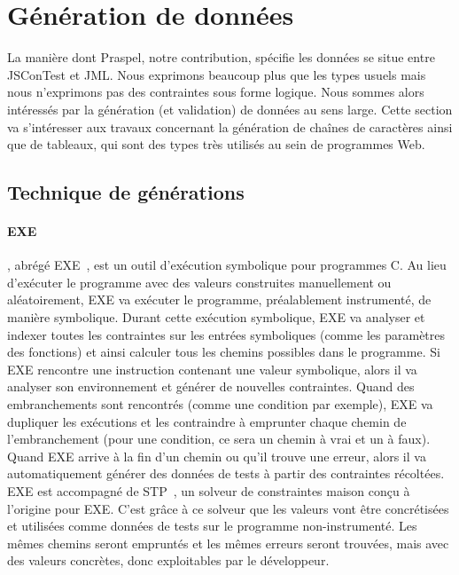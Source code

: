 \section{Génération de données}
\label{section:sota:data_generation}

La manière dont Praspel, notre contribution, spécifie les données se situe entre
JSConTest et JML. Nous exprimons beaucoup plus que les types usuels mais nous
n'exprimons pas des contraintes sous forme logique. Nous sommes alors
intéressés par la génération (et validation) de données au sens large. Cette
section va s'intéresser aux travaux concernant la génération de chaînes de
caractères ainsi que de tableaux, qui sont des types très utilisés au sein de
programmes Web.

\subsection{Technique de générations}

\paragraph{EXE} , abrégé
EXE~, est un outil d'exécution symbolique pour
programmes C. Au lieu d'exécuter le programme avec des valeurs construites
manuellement ou aléatoirement, EXE va exécuter le programme, préalablement
instrumenté, de manière symbolique. Durant cette exécution symbolique, EXE va
analyser et indexer toutes les contraintes sur les entrées symboliques (comme
les paramètres des fonctions) et ainsi calculer tous les chemins possibles dans
le programme.  Si EXE rencontre une instruction contenant une valeur symbolique,
alors il va analyser son environnement et générer de nouvelles contraintes.
Quand des embranchements sont rencontrés (comme une condition par exemple), EXE
va dupliquer les exécutions et les contraindre à emprunter chaque chemin de
l'embranchement (pour une condition, ce sera un chemin à vrai et un à faux).
Quand EXE arrive à la fin d'un chemin ou qu'il trouve une erreur, alors il va
automatiquement générer des données de tests à partir des contraintes récoltées.
EXE est accompagné de STP~, un solveur de constraintes maison
conçu à l'origine pour EXE. C'est grâce à ce solveur que les valeurs vont être
concrétisées et utilisées comme données de tests sur le programme
non-instrumenté. Les mêmes chemins seront empruntés et les mêmes erreurs seront
trouvées, mais avec des valeurs concrètes, donc exploitables par le développeur.

